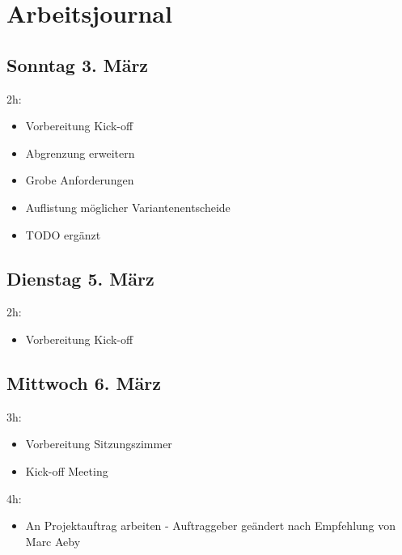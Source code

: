 \chapter{Arbeitsjournal}

\label{AppendixArbeitsjournal}

\section{Sonntag 3. März}\label{sonntag-3.-muxe4rz}

2h:

\begin{itemize}
  \tightlist
  \item
        Vorbereitung Kick-off
  \item
        Abgrenzung erweitern
  \item
        Grobe Anforderungen
  \item
        Auflistung möglicher Variantenentscheide
  \item
        TODO ergänzt
\end{itemize}

\section{Dienstag 5. März}\label{dienstag-5.muxe4rz}

2h:

\begin{itemize}
  \tightlist
  \item
        Vorbereitung Kick-off
\end{itemize}

\section{Mittwoch 6. März}\label{mittwoch-6.muxe4rz}

3h:

\begin{itemize}
  \tightlist
  \item
        Vorbereitung Sitzungszimmer
  \item
        Kick-off Meeting
\end{itemize}

4h:

\begin{itemize}
  \tightlist
  \item
        An Projektauftrag arbeiten - Auftraggeber geändert nach Empfehlung
        von Marc Aeby
\end{itemize}

